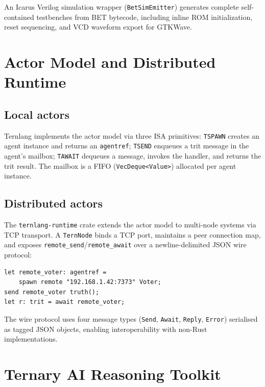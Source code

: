 \documentclass[journal,10pt,twocolumn]{IEEEtran}
\begin{document}
An Icarus Verilog simulation wrapper (\texttt{BetSimEmitter}) generates
complete self-contained testbenches from BET bytecode, including inline ROM
initialization, reset sequencing, and VCD waveform export for GTKWave.

\section{Actor Model and Distributed Runtime}
\label{sec:actors}

\subsection{Local actors}

Ternlang implements the actor model via three ISA primitives:
\texttt{TSPAWN} creates an agent instance and returns an \texttt{agentref};
\texttt{TSEND} enqueues a trit message in the agent's mailbox; \texttt{TAWAIT}
dequeues a message, invokes the handler, and returns the trit result. The
mailbox is a FIFO (\texttt{VecDeque<Value>}) allocated per agent instance.

\subsection{Distributed actors}

The \texttt{ternlang-runtime} crate extends the actor model to multi-node
systems via TCP transport. A \texttt{TernNode} binds a TCP port, maintains a
peer connection map, and exposes \texttt{remote\_send}/\texttt{remote\_await}
over a newline-delimited JSON wire protocol:

\begin{lstlisting}[language=ternlang,
  caption={Remote actor spawn in ternlang}]
let remote_voter: agentref =
    spawn remote "192.168.1.42:7373" Voter;
send remote_voter truth();
let r: trit = await remote_voter;
\end{lstlisting}

The wire protocol uses four message types (\texttt{Send}, \texttt{Await},
\texttt{Reply}, \texttt{Error}) serialised as tagged JSON objects, enabling
interoperability with non-Rust implementations.

\section{Ternary AI Reasoning Toolkit}
\label{sec:reasoning}
\end{document}
